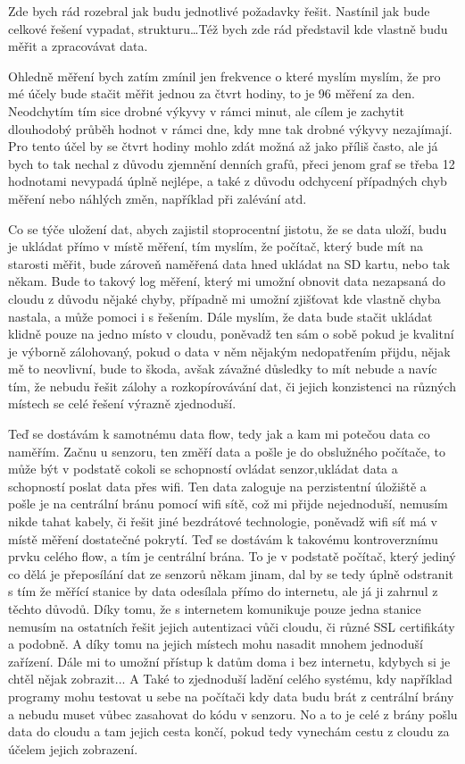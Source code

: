 Zde bych rád rozebral jak budu jednotlivé požadavky řešit. Nastínil jak bude celkové řešení vypadat, strukturu\ldots Též 
bych zde rád představil kde vlastně budu měřit a zpracovávat data.

Ohledně měření bych zatím zmínil jen frekvence o které myslím myslím, že pro mé účely bude stačit měřit jednou za čtvrt 
hodiny, to je 96 měření za den. Neodchytím tím sice drobné výkyvy v rámci minut, ale cílem je zachytit dlouhodobý průběh 
hodnot v rámci dne, kdy mne tak drobné výkyvy nezajímají. Pro tento účel by se čtvrt hodiny mohlo zdát možná až jako 
příliš často, ale já bych to tak nechal z důvodu zjemnění denních grafů, přeci jenom graf se třeba 12 hodnotami nevypadá 
úplně nejlépe, a také z důvodu odchycení případných chyb měření nebo náhlých změn, například při zalévání atd.

Co se týče uložení dat, abych zajistil stoprocentní jistotu, že se data uloží, budu je ukládat přímo v místě měření, tím 
myslím, že počítač, který bude mít na starosti měřit, bude zároveň naměřená data hned ukládat na SD kartu, nebo tak 
někam. Bude to takový log měření, který mi umožní obnovit data nezapsaná do cloudu z důvodu nějaké chyby, případně mi 
umožní zjišťovat kde vlastně chyba nastala, a může pomoci i s řešením. Dále myslím, že data bude stačit ukládat klidně 
pouze na jedno místo v cloudu, poněvadž ten sám o sobě pokud je kvalitní je výborně zálohovaný, pokud o data v něm 
nějakým nedopatřením přijdu, nějak mě to neovlivní, bude to škoda, avšak závažné důsledky to mít nebude a navíc tím, že 
nebudu řešit zálohy a rozkopírovávání dat, či jejich konzistenci na různých místech se celé řešení výrazně zjednoduší.

Teď se dostávám k samotnému data flow, tedy jak a kam mi potečou data co naměřím. Začnu u senzoru, ten změří data 
a pošle je do obslužného počítače, to může být v podstatě cokoli se schopností ovládat senzor,ukládat data a schopností 
poslat data přes wifi. Ten data zaloguje na perzistentní úložiště a pošle je na centrální bránu pomocí wifi sítě, což mi 
přijde nejednoduší, nemusím nikde tahat kabely, či řešit jiné bezdrátové technologie, poněvadž wifi síť má v místě 
měření dostatečné pokrytí. Teď se dostávám k takovému kontroverznímu prvku celého flow, a tím je centrální brána. To je 
v podstatě počítač, který jediný co dělá je přeposílání dat ze senzorů někam jinam, dal by se tedy úplně odstranit s tím 
že měřící stanice by data odesílala přímo do internetu, ale já ji zahrnul z těchto důvodů. Díky tomu, že s internetem 
komunikuje pouze jedna stanice nemusím na ostatních řešit jejich autentizaci vůči cloudu, či různé SSL certifikáty 
a podobně. A díky tomu na jejich místech mohu nasadit mnohem jednoduší zařízení. Dále mi to umožní přístup k datům doma 
i bez internetu, kdybych si je chtěl nějak zobrazit... A Také to zjednoduší ladění celého systému, kdy například 
programy mohu testovat u sebe na počítači kdy data budu brát z centrální brány a nebudu muset vůbec zasahovat do kódu 
v senzoru. No a to je celé z brány pošlu data do cloudu a tam jejich cesta končí, pokud tedy vynechám cestu z cloudu za 
účelem jejich zobrazení.
